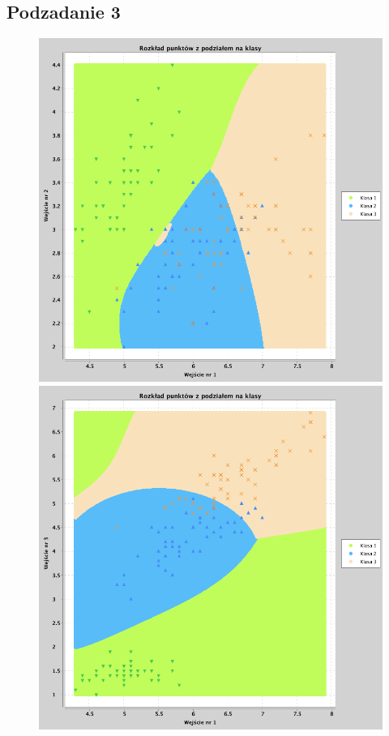 \documentclass[a4paper, portrait,11pt]{article}
\begin{document}
\subsection{Podzadanie 3}
\begin{figure}[!htb]
  \begin{minipage}{0.33\textwidth}
    \centering
    \includegraphics[width=1\linewidth]{../data/classification4/3/2_1,2.png}
    \caption{\label{fig:43_2_1,2}}
  \end{minipage}
  \begin{minipage}{0.33\textwidth}
    \centering
    \includegraphics[width=1\linewidth]{../data/classification4/3/2_1,3.png}

\end{minipage}
\end{figure}
\end{document}
